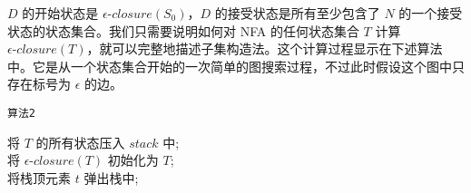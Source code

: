 $D$ 的开始状态是 $\epsilon \mbox{-} closure(S_{0})$，$D$ 的接受状态是所有至少包含了 $N$ 的一个接受状态的状态集合。我们只需要说明如何对 NFA 的任何状态集合 $T$ 计算 $\epsilon \mbox{-} closure(T)$，就可以完整地描述子集构造法。这个计算过程显示在下述算法中。它是从一个状态集合开始的一次简单的图搜索过程，不过此时假设这个图中只存在标号为 $\epsilon$ 的边。

\begin{algorithm}[H]
    \renewcommand{\thealgocf}{}
    \caption{\texttt{算法2}}
将 $T$ 的所有状态压入 $stack$ 中; \\
将 $\epsilon \mbox{-} closure(T)$ 初始化为 $T$; \\
 {
  将栈顶元素 $t$ 弹出栈中; \\
}
\end{algorithm}
